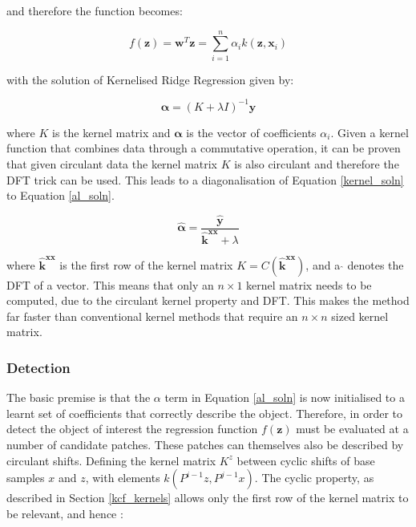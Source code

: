 \documentclass[11pt,twoside]{report}
\begin{document}
and therefore the function becomes:

\begin{equation}
f(\mathbf{z}) = \mathbf{w}^{T}\mathbf{z} = \sum_{i=1}^{n} \alpha_{i}k(\mathbf{z},\mathbf{x}_{i})
\end{equation}

with the solution of Kernelised Ridge Regression given by:

\begin{equation}
\mathbf{\alpha} = (K + \lambda I)^{-1} \mathbf{y}
\label{kernel_soln}
\end{equation}

where $K$ is the kernel matrix and $\mathbf{\alpha}$ is the vector of coefficients $\alpha_{i}$. Given a kernel function that combines data through a commutative operation, it can be proven that given circulant data the kernel matrix $K$ is also circulant and therefore the DFT trick can be used. This leads to a diagonalisation of Equation \ref{kernel_soln} to Equation \ref{al_soln}.

\begin{equation}
\mathbf{\hat{\alpha}} = \frac{\mathbf{\hat{y}}}{\mathbf{\hat{k}}^{\mathbf{xx}} + \lambda}
\label{al_soln}
\end{equation}

where $\mathbf{\hat{k}}^{\mathbf{xx}}$ is the first row of the kernel matrix $K = C(\mathbf{\hat{k}}^{\mathbf{xx}})$, and a $\hat{ }$ denotes the DFT of a vector. This means that only an $n \times 1$ kernel matrix needs to be computed, due to the circulant kernel property and DFT. This makes the method far faster than conventional kernel methods that require an $n \times n$ sized kernel matrix.


\subsubsection{Detection}

The basic premise is that the $\alpha$ term in Equation \ref{al_soln} is now initialised to a learnt set of coefficients that correctly describe the object. Therefore, in order to detect the object of interest the regression function $f(\mathbf{z})$ must be evaluated at a number of candidate patches.  These patches can themselves also be described by circulant shifts. Defining the kernel matrix $K^{z}$ between cyclic shifts of base samples $x$ and $z$, with elements $k(P^{i-1}z,P^{j-1}x)$. The cyclic property, as described in Section \ref{kcf_kernels} allows only the first row of the kernel matrix to be relevant, and hence :
\end{document}
